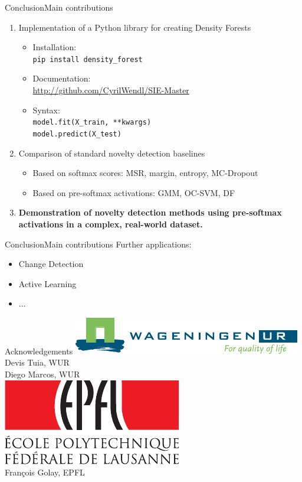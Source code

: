 \documentclass{beamer}
\begin{document}
\begin{frame}{Conclusion}{Main contributions}
\begin{enumerate}
	\item Implementation of a Python library for creating Density Forests
	\begin{itemize}
		\item Installation:\\
		\texttt{pip install density\_forest}\pause
		\item Documentation:\\ \url{http://github.com/CyrilWendl/SIE-Master}\pause
		\item Syntax:\\
		 \texttt{model.fit(X\_train, **kwargs)}\\ \texttt{model.predict(X\_test)}\pause
	\end{itemize}
	\item Comparison of standard novelty detection baselines
	\begin{itemize}
		\item Based on softmax scores: \gls{MSR}, margin, entropy, \gls{MC-Dropout}
		\item Based on pre-softmax activations: \gls{GMM}, \gls{OC-SVM}, \gls{DF}
	\end{itemize}
	\item \textbf{Demonstration of novelty detection methods using pre-softmax activations in a complex, real-world dataset.} \\
\end{enumerate}
\end{frame}

\begin{frame}{Conclusion}{Main contributions}
	Further applications:
	\begin{itemize}
		\item Change Detection
		\item Active Learning
		\item $\dots$
	\end{itemize}
\end{frame}



\begin{frame}{Acknowledgements}
\centering\includegraphics[width=.4\textwidth]{logo_wur_quality_of_life}\\[.2cm]
Devis Tuia, WUR\\[.2cm]
Diego Marcos, WUR\\[.2cm]
\vfill
\includegraphics[width=.2\textwidth]{logo}\\[.2cm]
François Golay, EPFL
\end{frame}
\end{document}
